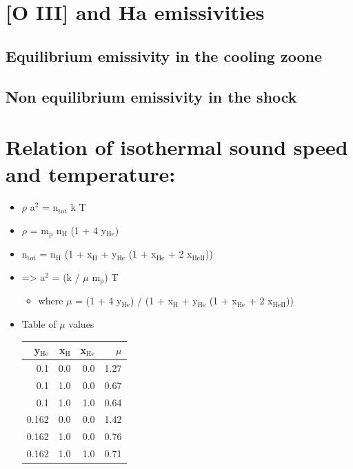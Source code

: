 \documentclass[11pt]{article}
\begin{document}
\section{[O III] and Ha emissivities}
\label{sec:orgheadline5}

\subsection{Equilibrium emissivity in the cooling zoone}
\label{sec:orgheadline3}

\subsection{Non equilibrium emissivity in the shock}
\label{sec:orgheadline4}




\section{Relation of isothermal sound speed and temperature:}
\label{sec:orgheadline6}
\begin{itemize}
\item \(\rho\) a\(^{\text{2}}\) = n\(_{\text{tot}}\) k T
\item \(\rho\) = m\(_{\text{p}}\) n\(_{\text{H}}\) (1 + 4 y\(_{\text{He}}\))
\item n\(_{\text{tot}}\) = n\(_{\text{H}}\) (1 + x\(_{\text{H}}\) + y\(_{\text{He}}\) (1 + x\(_{\text{He}}\) + 2 x\(_{\text{HeII}}\)))
\item => a\(^{\text{2}}\) = (k / \(\mu\) m\(_{\text{p}}\)) T
\begin{itemize}
\item where \(\mu\) = (1 + 4 y\(_{\text{He}}\)) / (1 + x\(_{\text{H}}\) + y\(_{\text{He}}\) (1 + x\(_{\text{He}}\) + 2 x\(_{\text{HeII}}\)))
\end{itemize}
\item Table of \(\mu\) values
\begin{center}
\begin{tabular}{rrrr}
y\(_{\text{He}}\) & x\(_{\text{H}}\) & x\(_{\text{He}}\) & \(\mu\)\\
\hline
0.1 & 0.0 & 0.0 & 1.27\\
0.1 & 1.0 & 0.0 & 0.67\\
0.1 & 1.0 & 1.0 & 0.64\\
\hline
0.162 & 0.0 & 0.0 & 1.42\\
0.162 & 1.0 & 0.0 & 0.76\\
0.162 & 1.0 & 1.0 & 0.71\\
\end{tabular}
\end{center}
\end{itemize}
\end{document}

